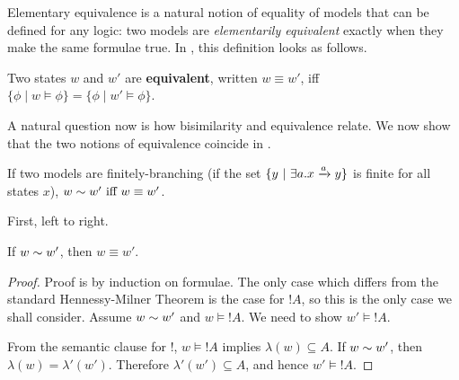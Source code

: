 Elementary equivalence is a natural notion of equality of models that
can be defined for any logic: two models are \emph{elementarily
  equivalent} exactly when they make the same formulae true. In \ELABR{}, this definition looks as follows.

\begin{definition}
Two states $w$ and $w'$ are {\bf equivalent}, written $w \equiv w'$,
iff $\{\phi \; | \; w \models \phi\} = \{\phi \; | \; w' \models
\phi\}$.
\end{definition}

\NI A natural question now is how bisimilarity and equivalence
relate. We now show that the two notions of equivalence coincide in
\ELFULL{}.

\begin{theorem}
\label{hennessymilnertheorem}
If two models are finitely-branching (if the set $\{y \ | \  \exists a
. x \xrightarrow{a} y\}$ is finite for all states $x$), $w \sim w'
\mbox{ iff } w \equiv w' $.
\end{theorem}
First, left to right.
\begin{case}
If $w \sim w'$, then $w \equiv w'$.
\end{case}
\begin{proof}
Proof is by induction on formulae.  The only case which differs from
the standard Hennessy-Milner Theorem is the case for $!A$, so this is
the only case we shall consider.  Assume $w \sim w'$ and $w \models
!A$. We need to show $w' \models !A$.

From the semantic clause for $!$,  $w \models !A$ implies $\lambda(w) \subseteq A$.
If $w \sim w'$, then $\lambda(w) = \lambda'(w')$.
Therefore $\lambda'(w') \subseteq A$, and hence $w' \models !A$.

\end{proof}

